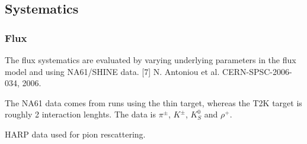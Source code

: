 
\subsection{Systematics}


\subsubsection{Flux}
\label{subsec:ND280:syst:det}
The flux systematics are evaluated by varying underlying parameters in the flux model and using NA61/SHINE  data. [7] N. Antoniou et al. CERN-SPSC-2006-034, 2006.

The NA61 data comes from runs using the thin target, whereas the T2K target is roughly 2 interaction lenghts. The data is $\pi^\pm$, $K^\pm$, $K^0_S$ and $\rho^+$.

HARP data used for pion rescattering.

